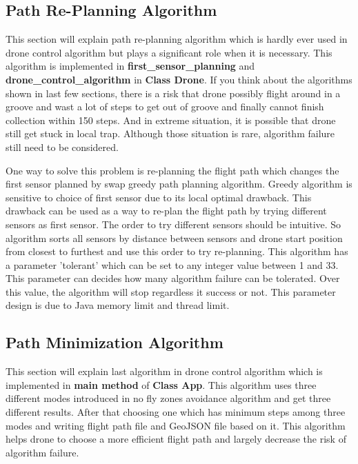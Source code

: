 \documentclass[12pt]{article}
\begin{document}
\subsection {Path Re-Planning Algorithm}
This section will explain path re-planning algorithm which is hardly ever used in drone control algorithm but plays a significant role when it is necessary. This algorithm is implemented in \textbf{first\_sensor\_planning} and \textbf{drone\_control\_algorithm} in \textbf{Class Drone}. If you think about the algorithms shown in last few sections, there is a risk that drone possibly flight around in a groove and wast a lot of steps to get out of groove and finally cannot finish collection within 150 steps. And in extreme situation, it is possible that drone still get stuck in local trap. Although those situation is rare, algorithm failure still need to be considered.

One way to solve this problem is re-planning the flight path which changes the first sensor planned by swap greedy path planning algorithm. Greedy algorithm is sensitive to choice of first sensor due to its local optimal drawback. This drawback can be used as a way to re-plan the flight path by trying different sensors as first sensor. The order to try different sensors should be intuitive. So algorithm sorts all sensors by distance between sensors and drone start position from closest to furthest and use this order to try re-planning. This algorithm has a parameter 'tolerant' which can be set to any integer value between 1 and 33. This parameter can decides how many algorithm failure can be tolerated. Over this value, the algorithm will stop regardless it success or not. This parameter design is due to Java memory limit and thread limit.

\subsection{Path Minimization Algorithm}
This section will explain last algorithm in drone control algorithm which is implemented in \textbf{main method} of \textbf{Class App}. This algorithm uses three different modes introduced in no fly zones avoidance algorithm and get three different results. After that choosing one which has minimum steps among three modes and writing flight path file and GeoJSON file based on it. This algorithm helps drone to choose a more efficient flight path and largely decrease the risk of algorithm failure.
\end{document}
